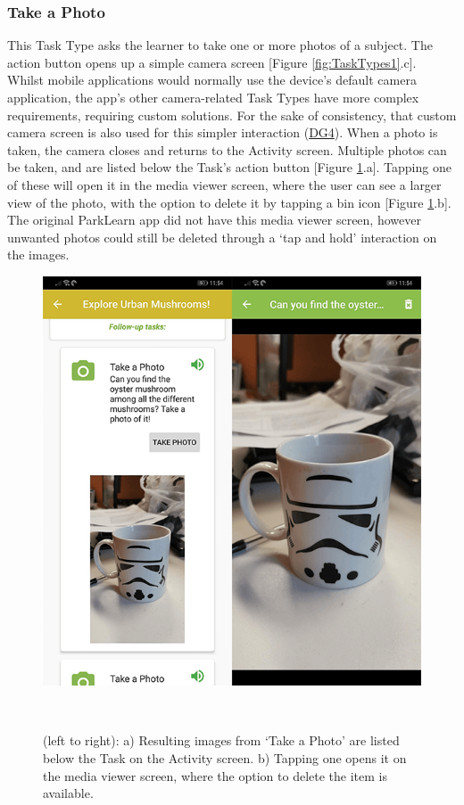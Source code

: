 \subsubsection*{Take a Photo}
This Task Type asks the learner to take one or more photos of a subject. The action button opens up a simple camera screen [Figure \ref{fig:TaskTypes1}.c]. Whilst mobile applications would normally use the device's default camera application, the app's other camera-related Task Types have more complex requirements, requiring custom solutions. For the sake of consistency, that custom camera screen is also used for this simpler interaction (\hyperref[DG4]{DG4}). When a photo is taken, the camera closes and returns to the Activity screen. Multiple photos can be taken, and are listed below the Task's action button [Figure \ref{fig:MediaViewer}.a]. Tapping one of these will open it in the media viewer screen, where the user can see a larger view of the photo, with the option to delete it by tapping a bin icon [Figure \ref{fig:MediaViewer}.b]. The original ParkLearn app did not have this media viewer screen, however unwanted photos could still be deleted through a `tap and hold' interaction on the images.

\begin{figure}
  \centering
  \includegraphics[width=0.55\columnwidth]{images/chapter05/mediaViewer.png}
  \caption[OurPlace's media viewer]{(left to right): a) Resulting images from `Take a Photo' are listed below the Task on the Activity screen. b) Tapping one opens it on the media viewer screen, where the option to delete the item is available.}~\label{fig:MediaViewer}
\end{figure}

